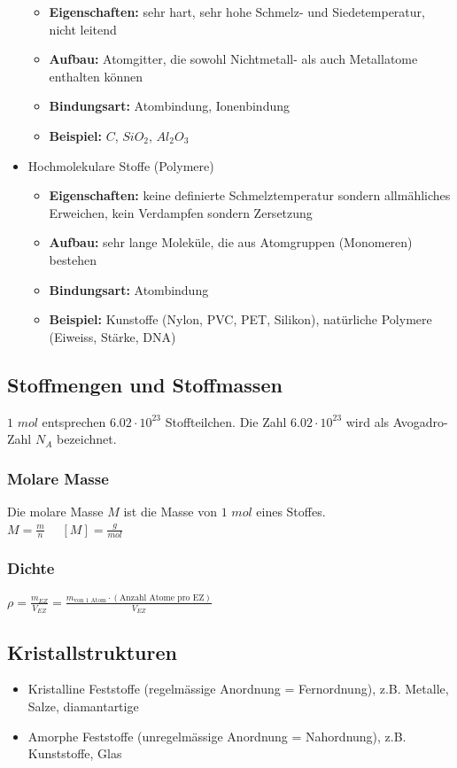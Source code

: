 \begin{itemize}
	\begin{itemize}
	    \item \textbf{Eigenschaften:} sehr hart, sehr hohe Schmelz- und Siedetemperatur, nicht leitend
	    \item \textbf{Aufbau:} Atomgitter, die sowohl Nichtmetall- als auch Metallatome enthalten können
	    \item \textbf{Bindungsart:} Atombindung, Ionenbindung
	    \item \textbf{Beispiel:} $C$, $SiO_2$, $Al_2O_3$
	\end{itemize}
	\item Hochmolekulare Stoffe (Polymere)
	\begin{itemize}
	    \item \textbf{Eigenschaften:} keine definierte Schmelztemperatur sondern allmähliches Erweichen, kein Verdampfen sondern Zersetzung
	    \item \textbf{Aufbau:} sehr lange Moleküle, die aus Atomgruppen (Monomeren) bestehen
	    \item \textbf{Bindungsart:} Atombindung
	    \item \textbf{Beispiel:} Kunstoffe (Nylon, PVC, PET, Silikon), natürliche Polymere (Eiweiss, Stärke, DNA)
	\end{itemize}
\end{itemize}

\subsection{Stoffmengen und Stoffmassen}
$1$ $mol$ entsprechen $6.02 \cdot 10^{23}$ Stoffteilchen. Die Zahl $6.02 \cdot 10^{23}$ wird als Avogadro-Zahl $N_A$ bezeichnet.

\subsubsection{Molare Masse}
Die molare Masse $M$ ist die Masse von $1$ $mol$ eines Stoffes. \\
$M=\frac{m}{n}$ \ \ $[M]=\frac{g}{mol}$

\subsubsection{Dichte}
$\rho = \frac{m_{EZ}}{V_{EZ}} = \frac{m_{\text{von 1 Atom}} \cdot (\text{Anzahl Atome pro EZ})}{V_{EZ}}$

\subsection{Kristallstrukturen}
\begin{itemize}
	\item Kristalline Feststoffe (regelmässige Anordnung = Fernordnung), z.B. Metalle, Salze, diamantartige
	\item Amorphe Feststoffe (unregelmässige Anordnung = Nahordnung), z.B. Kunststoffe, Glas
\end{itemize}


